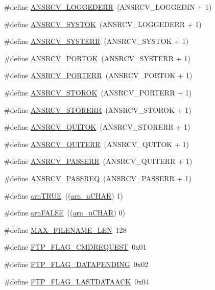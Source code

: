 \begin{DoxyCompactItemize}
\#define \hyperlink{group__ftp_gaadb31db9b1610a09c7500c7158f6ac43}{ANSRCV\_\-LOGGEDERR}~(ANSRCV\_\-LOGGEDIN + 1)
\item 
\#define \hyperlink{group__ftp_ga329baca85e9f8b3b9821fa0395590f40}{ANSRCV\_\-SYSTOK}~(ANSRCV\_\-LOGGEDERR + 1)
\item 
\#define \hyperlink{group__ftp_ga91b65b8976afb7231704b61d08ae0ce9}{ANSRCV\_\-SYSTERR}~(ANSRCV\_\-SYSTOK + 1)
\item 
\#define \hyperlink{group__ftp_ga24b535f4d97e4e04e57f55ad71c89ad1}{ANSRCV\_\-PORTOK}~(ANSRCV\_\-SYSTERR + 1)
\item 
\#define \hyperlink{group__ftp_gacef9c9ff9562f789bd2c2064614a87ac}{ANSRCV\_\-PORTERR}~(ANSRCV\_\-PORTOK + 1)
\item 
\#define \hyperlink{group__ftp_gac3320b3c2c43f63bd603b158d11ef645}{ANSRCV\_\-STOROK}~(ANSRCV\_\-PORTERR + 1)
\item 
\#define \hyperlink{group__ftp_ga06e928901b2fbf3c556b71f53c5f75bb}{ANSRCV\_\-STORERR}~(ANSRCV\_\-STOROK + 1)
\item 
\#define \hyperlink{group__ftp_ga39cc057d93b388cc8b9a15ee259656cb}{ANSRCV\_\-QUITOK}~(ANSRCV\_\-STORERR + 1)
\item 
\#define \hyperlink{group__ftp_ga5f1a8e5f8462eb6f8788e7a200c318b4}{ANSRCV\_\-QUITERR}~(ANSRCV\_\-QUITOK + 1)
\item 
\#define \hyperlink{group__ftp_ga0283e7472be62c40d4c08580ac6de3c0}{ANSRCV\_\-PASSERR}~(ANSRCV\_\-QUITERR + 1)
\item 
\#define \hyperlink{group__ftp_ga6615198a241d31598ce0f3b1d66d3d2c}{ANSRCV\_\-PASSREQ}~(ANSRCV\_\-PASSERR + 1)
\item 
\#define \hyperlink{group__ftp_ga055af4196bea1958758ca64e79eb7f34}{arnTRUE}~((\hyperlink{group__ftp_ga748121386e994966f8a87f4160f055b4}{arn\_\-uCHAR}) 1)
\item 
\#define \hyperlink{group__ftp_ga794b8af31b90186c33457a23fda0e759}{arnFALSE}~((\hyperlink{group__ftp_ga748121386e994966f8a87f4160f055b4}{arn\_\-uCHAR}) 0)
\item 
\#define \hyperlink{group__ftp_gacc9794f655f61a3246ba3fd5c9c67e14}{MAX\_\-FILENAME\_\-LEN}~128
\item 
\#define \hyperlink{group__ftp_ga39836d3275006cfefb6440e2a0183422}{FTP\_\-FLAG\_\-CMDREQUEST}~0x01
\item 
\#define \hyperlink{group__ftp_ga087d93636e55977f833c29ade04e6228}{FTP\_\-FLAG\_\-DATAPENDING}~0x02
\item 
\#define \hyperlink{group__ftp_ga8f00393bff55298d298b977325ef817a}{FTP\_\-FLAG\_\-LASTDATAACK}~0x04

\end{DoxyCompactItemize}
